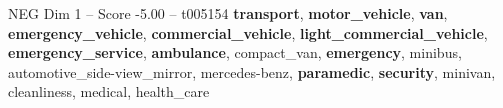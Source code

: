 \begin{textsample}{NEG Dim 1 – Score -5.00 – t005154}  \label{ex:f1_neg_007}
\textbf{transport}, \textbf{motor\_vehicle}, \textbf{van}, \textbf{emergency\_vehicle}, \textbf{commercial\_vehicle}, \textbf{light\_commercial\_vehicle}, \textbf{emergency\_service}, \textbf{ambulance}, compact\_van, \textbf{emergency}, minibus, automotive\_side-view\_mirror, mercedes-benz, \textbf{paramedic}, \textbf{security}, minivan, cleanliness, medical, health\_care

\end{textsample}
